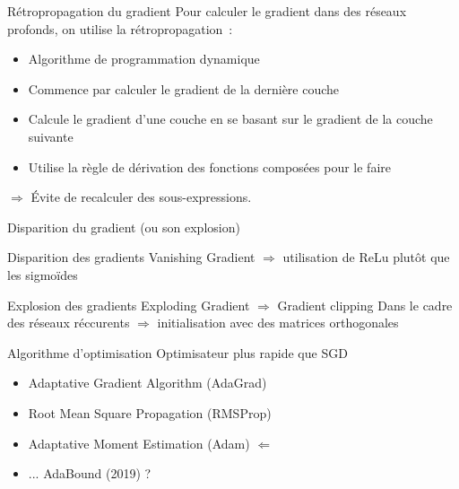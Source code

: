 \begin{frame}{Rétropropagation du gradient}
  Pour calculer le gradient dans des réseaux profonds, on utilise la rétropropagation~:

  \begin{itemize}
    \item Algorithme de programmation dynamique
    \item Commence par calculer le gradient de la dernière couche
    \item Calcule le gradient d'une couche en se basant sur le gradient de la couche suivante
    \item Utilise la règle de dérivation des fonctions composées pour le faire
  \end{itemize}

  $\Rightarrow$ Évite de recalculer des sous-expressions.
\end{frame}

\begin{frame}{Disparition du gradient (ou son explosion)}
\end{frame}

\begin{frame}{Disparition des gradients}
  Vanishing Gradient $\Rightarrow$ utilisation de ReLu plutôt que les sigmoïdes
  \vfill
\end{frame}

\begin{frame}{Explosion des gradients}
  Exploding Gradient $\Rightarrow$ Gradient clipping
  Dans le cadre des réseaux réccurents $\Rightarrow$ initialisation avec des matrices orthogonales
\end{frame}

\begin{frame}{Algorithme d'optimisation}
  Optimisateur plus rapide que SGD
  \begin{itemize}[<+(1)->]
    \item Adaptative Gradient Algorithm (AdaGrad)
    \item Root Mean Square Propagation (RMSProp)
    \item Adaptative Moment Estimation (Adam)    $\Leftarrow$
    \item ... AdaBound (2019) ?
  \end{itemize}
\end{frame}

